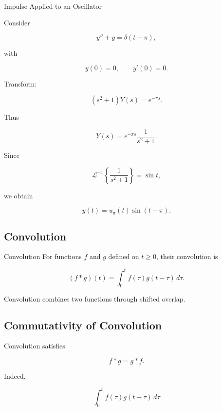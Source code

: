 \begin{workedexamplebox}{Impulse Applied to an Oscillator}

Consider

\[
y''+y
=
\delta(t-\pi),
\]

with

\[
y(0)=0,
\qquad
y'(0)=0.
\]

Transform:

\[
(s^2+1)Y(s)
=
e^{-\pi s}.
\]

Thus

\[
Y(s)
=
e^{-\pi s}
\frac1{s^2+1}.
\]

Since

\[
\mathcal{L}^{-1}
\left\{
\frac1{s^2+1}
\right\}
=
\sin t,
\]

we obtain

\begin{answerbox}
\[
\boxed{
y(t)
=
u_\pi(t)
\sin(t-\pi).
}
\]
\end{answerbox}

\end{workedexamplebox}

\subsection{Convolution}
\label{subsec:convolution}

\begin{definitionbox}{Convolution}
For functions \(f\) and \(g\) defined on \(t\geq0\), their convolution is

\[
\boxed{
(f*g)(t)
=
\int_0^t
f(\tau)
g(t-\tau)
\,d\tau.
}
\]
\end{definitionbox}

Convolution combines two functions through shifted overlap.

\subsection{Commutativity of Convolution}
\label{subsec:convolution-commutative}

Convolution satisfies

\[
\boxed{
f*g
=
g*f.
}
\]

Indeed,

\[
\int_0^t
f(\tau)
g(t-\tau)
\,d\tau
\]

